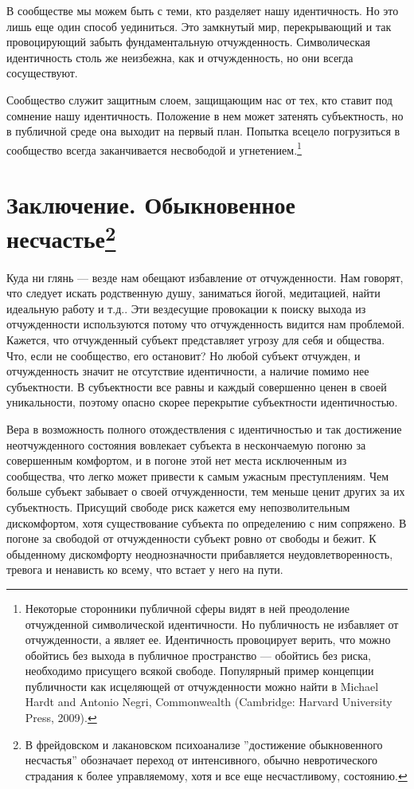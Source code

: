 \documentclass[12pt]{book}
\begin{document}
В сообществе мы можем быть с теми, кто разделяет нашу идентичность. Но это лишь еще один способ уединиться. Это замкнутый мир, перекрывающий и так провоцирующий забыть фундаментальную отчужденность. Символическая идентичность столь же неизбежна, как и отчужденность, но они всегда сосуществуют.

Сообщество служит защитным слоем, защищающим нас от тех, кто ставит под сомнение нашу идентичность. Положение в нем может затенять субъектность, но в публичной среде она выходит на первый план. Попытка всецело погрузиться в сообщество всегда заканчивается несвободой и угнетением.\footnote{Некоторые сторонники публичной сферы видят в ней преодоление отчужденной символической идентичности. Но публичность не избавляет от отчужденности, а являет ее. Идентичность провоцирует верить, что можно обойтись без выхода в публичное пространство --- обойтись без риска, необходимо присущего всякой свободе. Популярный пример концепции публичности как исцеляющей от отчужденности можно найти в Michael Hardt and Antonio Negri, Commonwealth (Cambridge: Harvard University Press, 2009).}

\chapter{Заключение. Обыкновенное несчастье\footnote{В фрейдовском и лакановском психоанализе ''достижение обыкновенного несчастья'' обозначает переход от интенсивного, обычно невротического страдания к более управляемому, хотя и все еще несчастливому, состоянию.}}

Куда ни глянь --- везде нам обещают избавление от отчужденности. Нам говорят, что следует искать родственную душу, заниматься йогой, медитацией, найти идеальную работу и т.д.. Эти вездесущие провокации к поиску выхода из отчужденности используются потому что отчужденность видится нам проблемой. Кажется, что отчужденный субъект представляет угрозу для себя и общества. Что, если не сообщество, его остановит? Но любой субъект отчужден, и отчужденность значит не отсутствие идентичности, а наличие помимо нее субъектности. В субъектности все равны и каждый совершенно ценен в своей уникальности, поэтому опасно скорее перекрытие субъектности идентичностью.

Вера в возможность полного отождествления с идентичностью и так достижение неотчужденного состояния вовлекает субъекта в нескончаемую погоню за совершенным комфортом, и в погоне этой нет места исключенным из сообщества, что легко может привести к самым ужасным преступлениям. Чем больше субъект забывает о своей отчужденности, тем меньше ценит других за их субъектность. Присущий свободе риск кажется ему непозволительным дискомфортом, хотя существование субъекта по определению с ним сопряжено. В погоне за свободой от отчужденности субъект ровно от свободы и бежит. К обыденному дискомфорту неоднозначности прибавляется неудовлетворенность, тревога и ненависть ко всему, что встает у него на пути.
\end{document}
